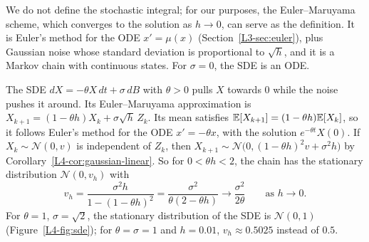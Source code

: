 We do not define the stochastic integral; for our purposes, the Euler--Maruyama scheme, which converges to the solution as $h \to 0$, can serve as the definition. It is Euler's method for the ODE $x' = \mu(x)$ (Section~\ref{L3-sec:euler}), plus Gaussian noise whose standard deviation is proportional to $\sqrt{h}$, and it is a Markov chain with continuous states. For $\sigma = 0$, the SDE is an ODE.

\begin{example}\label{L4-ex:ou}
    The SDE $dX = -\theta X\,dt + \sigma\,dB$ with $\theta > 0$ pulls $X$ towards $0$ while the noise pushes it around. Its Euler--Maruyama approximation is $X_{k+1} = (1 - \theta h)X_k + \sigma\sqrt{h}\,Z_k$. Its mean satisfies $\mathbb{E}[X_{k+1}] = (1 - \theta h)\mathbb{E}[X_k]$, so it follows Euler's method for the ODE $x' = -\theta x$, with the solution $e^{-\theta t}X(0)$. If $X_k \sim \mathcal{N}(0, v)$ is independent of $Z_k$, then $X_{k+1} \sim \mathcal{N}\big(0, (1 - \theta h)^2v + \sigma^2h\big)$ by Corollary~\ref{L4-cor:gaussian-linear}. So for $0 < \theta h < 2$, the chain has the stationary distribution $\mathcal{N}(0, v_h)$ with
    \[v_h = \frac{\sigma^2h}{1 - (1 - \theta h)^2} = \frac{\sigma^2}{\theta(2 - \theta h)} \to \frac{\sigma^2}{2\theta} \qquad \text{as } h \to 0.\]
    For $\theta = 1$, $\sigma = \sqrt{2}$, the stationary distribution of the SDE is $\mathcal{N}(0, 1)$ (Figure~\ref{L4-fig:sde}); for $\theta = \sigma = 1$ and $h = 0.01$, $v_h \approx 0.5025$ instead of $0.5$.
\end{example}

